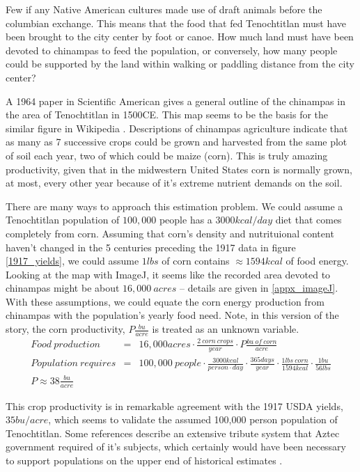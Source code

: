\documentclass[12pt]{iopart}
\newcommand{\bea}{\begin{eqnarray}}
\newcommand{\eea}{\end{eqnarray}}
\begin{document}
Few if any Native American cultures made use of draft animals before the columbian exchange.  This means that the food that fed Tenochtitlan must have been brought to the city center by foot or canoe.  How much land must have been devoted to chinampas to feed the population, or conversely, how many people could be supported by the land within walking or paddling distance from the city center?

A 1964 paper in Scientific American \cite{Chinampas_1964} gives a general outline of the chinampas in the area of Tenochtitlan in 1500CE.  This map seems to be the basis for the similar figure in Wikipedia \cite{chinampas_wikipedia}.  Descriptions of chinampas agriculture indicate that as many as 7 successive crops could be grown and harvested from the same plot of soil each year, two of which could be maize (corn).  This is truly amazing productivity, given that in the midwestern United States corn is normally grown, at most, every other year because of it's extreme nutrient demands on the soil.

There are many ways to approach this estimation problem.  We could assume a Tenochtitlan population of $100,000$ people has a $3000kcal/day$ diet that comes completely from corn.  Assuming that corn's density and nutrituional content haven't changed in the 5 centuries preceding the 1917 data in figure \ref{1917_yields}, we could assume $1lbs$ of corn contains $\approx1594kcal$ of food energy.  
Looking at the map with ImageJ, it seems like the recorded area devoted to chinampas might be about
$16,000~acres$ -- details are given in \ref{appx_imageJ}.
With these assumptions, we could equate the corn energy production from chinampas with the population's yearly food need. Note, in this version of the story, the corn productivity, $P\frac{bu}{acre}$ is treated as an unknown variable.  
\bea
Food~production &=& 16,000acres\cdot \frac{2~corn~crops}{year}\cdot P \frac{bu~of~corn}{acre} \nonumber \\
Population~requires &=& 100,000~people\cdot \frac{3000kcal}{person\cdot day}\cdot\frac{365days}{year}\cdot\frac{1lbs~corn}{1594kcal}\cdot\frac{1bu}{56lbs} \nonumber \\
P \approx 38\frac{bu}{acre} && 
\eea

This crop productivity is in remarkable agreement with the 1917 USDA yields, $35bu/acre$, which seems to validate the assumed 100,000 person population of Tenochtitlan.  Some references \cite{Chinampas_1964} describe an extensive tribute system that Aztec government required of it's subjects, which certainly would have been necessary to support populations on the upper end of historical estimates \cite{400k}.
\end{document}
